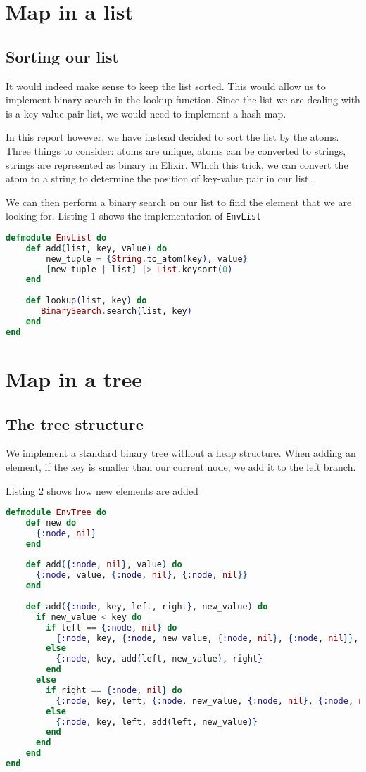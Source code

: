 
\section{Map in a list}
\subsection{Sorting our list}
It would indeed make sense to keep the list sorted. This would allow us to implement binary search in the lookup function. Since the list we are dealing with is a key-value pair list, we would need to implement a hash-map.

In this report however, we have instead decided to sort the list by the atoms. Three things to consider: atoms are unique, atoms can be converted to strings, strings are represented as binary in Elixir. Which this trick, we can convert the atom to a string to determine the position of key-value pair in our list.

We can then perform a binary search on our list to find the element that we are looking for. Listing 1 shows the implementation of \texttt{EnvList}

\begin{lstlisting}[language=Elixir, caption=EnvList module ]
defmodule EnvList do  
    def add(list, key, value) do
        new_tuple = {String.to_atom(key), value}
        [new_tuple | list] |> List.keysort(0)
    end
    
    def lookup(list, key) do
       BinarySearch.search(list, key)
    end
end
\end{lstlisting}


\section{Map in a tree}
\subsection{The tree structure}
We implement a standard binary tree without a heap structure. When adding an element, if the key is smaller than our current node, we add it to the left branch. 

Listing 2 shows how new elements are added
\begin{lstlisting}[language=Elixir, caption=Add function EnvTree]
defmodule EnvTree do
    def new do
      {:node, nil}
    end
  
    def add({:node, nil}, value) do
      {:node, value, {:node, nil}, {:node, nil}}
    end
  
    def add({:node, key, left, right}, new_value) do
      if new_value < key do
        if left == {:node, nil} do
          {:node, key, {:node, new_value, {:node, nil}, {:node, nil}}, right}
        else
          {:node, key, add(left, new_value), right}
        end
      else
        if right == {:node, nil} do
          {:node, key, left, {:node, new_value, {:node, nil}, {:node, nil}}}
        else
          {:node, key, left, add(left, new_value)}
        end
      end
    end
end
\end{lstlisting}

